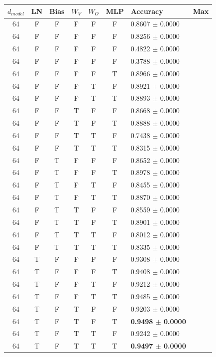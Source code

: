 \begin{tabular}{c c c c c c l c}
\toprule
$d_{model}$ & LN & Bias & $W_V$ & $W_O$ & MLP & Accuracy & Max \\
\midrule
64 & F & F & F & F & F & 0.8607 $\pm$ 0.0000 \\
64 & F & F & F & F & F & 0.8256 $\pm$ 0.0000 \\
64 & F & F & F & F & F & 0.4822 $\pm$ 0.0000 \\
64 & F & F & F & F & F & 0.3788 $\pm$ 0.0000 \\
64 & F & F & F & F & T & 0.8966 $\pm$ 0.0000 \\
64 & F & F & F & T & F & 0.8921 $\pm$ 0.0000 \\
64 & F & F & F & T & T & 0.8893 $\pm$ 0.0000 \\
64 & F & F & T & F & F & 0.8668 $\pm$ 0.0000 \\
64 & F & F & T & F & T & 0.8888 $\pm$ 0.0000 \\
64 & F & F & T & T & F & 0.7438 $\pm$ 0.0000 \\
64 & F & F & T & T & T & 0.8315 $\pm$ 0.0000 \\
64 & F & T & F & F & F & 0.8652 $\pm$ 0.0000 \\
64 & F & T & F & F & T & 0.8978 $\pm$ 0.0000 \\
64 & F & T & F & T & F & 0.8455 $\pm$ 0.0000 \\
64 & F & T & F & T & T & 0.8870 $\pm$ 0.0000 \\
64 & F & T & T & F & F & 0.8559 $\pm$ 0.0000 \\
64 & F & T & T & F & T & 0.8901 $\pm$ 0.0000 \\
64 & F & T & T & T & F & 0.8012 $\pm$ 0.0000 \\
64 & F & T & T & T & T & 0.8335 $\pm$ 0.0000 \\
64 & T & F & F & F & F & 0.9308 $\pm$ 0.0000 \\
64 & T & F & F & F & T & 0.9408 $\pm$ 0.0000 \\
64 & T & F & F & T & F & 0.9212 $\pm$ 0.0000 \\
64 & T & F & F & T & T & 0.9485 $\pm$ 0.0000 \\
64 & T & F & T & F & F & 0.9203 $\pm$ 0.0000 \\
64 & T & F & T & F & T & \textbf{0.9498 $\pm$ 0.0000} \\
64 & T & F & T & T & F & 0.9242 $\pm$ 0.0000 \\
64 & T & F & T & T & T & \textbf{0.9497 $\pm$ 0.0000} \\

\end{tabular}
